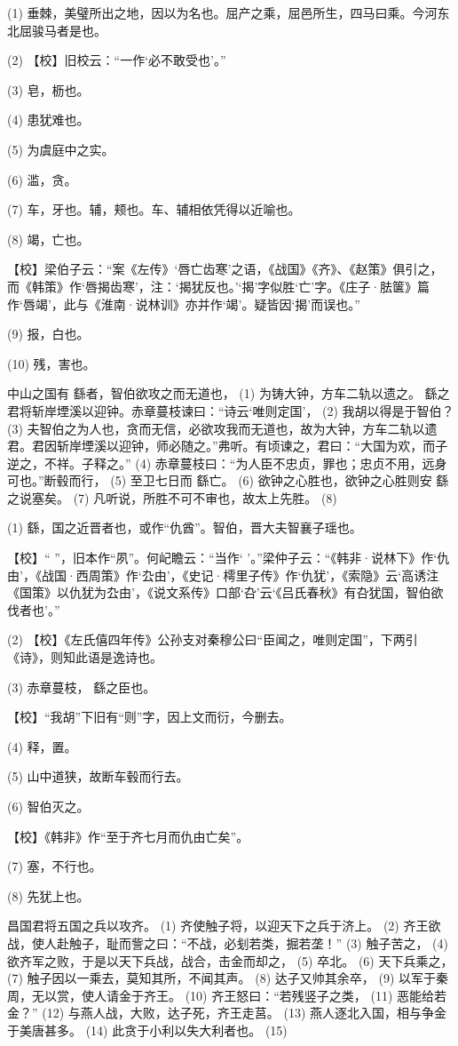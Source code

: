 \documentclass[12pt,UTF8]{ctexbook}
\begin{document}
(1) 垂棘，美璧所出之地，因以为名也。屈产之乘，屈邑所生，四马曰乘。今河东北屈骏马者是也。

(2) 【校】旧校云：“一作‘必不敢受也’。”

(3) 皂，枥也。

(4) 患犹难也。

(5) 为虞庭中之实。

(6) 滥，贪。

(7) 车，牙也。辅，颊也。车、辅相依凭得以近喻也。

(8) 竭，亡也。

【校】梁伯子云：“案《左传》‘唇亡齿寒’之语，《战国》《齐》、《赵策》俱引之，而《韩策》作‘唇揭齿寒’，注：‘揭犹反也。’‘揭’字似胜‘亡’字。《庄子·胠箧》篇作‘唇竭’，此与《淮南·说林训》亦并作‘竭’。疑皆因‘揭’而误也。”

(9) 报，白也。

(10) 残，害也。

中山之国有 繇者，智伯欲攻之而无道也， (1) 为铸大钟，方车二轨以遗之。 繇之君将斩岸堙溪以迎钟。赤章蔓枝谏曰：“诗云‘唯则定国’， (2) 我胡以得是于智伯？ (3) 夫智伯之为人也，贪而无信，必欲攻我而无道也，故为大钟，方车二轨以遗君。君因斩岸堙溪以迎钟，师必随之。”弗听。有顷谏之，君曰：“大国为欢，而子逆之，不祥。子释之。” (4) 赤章蔓枝曰：“为人臣不忠贞，罪也；忠贞不用，远身可也。”断毂而行， (5) 至卫七日而 繇亡。 (6) 欲钟之心胜也，欲钟之心胜则安 繇之说塞矣。 (7) 凡听说，所胜不可不审也，故太上先胜。 (8)

(1) 繇，国之近晋者也，或作“仇酋”。智伯，晋大夫智襄子瑶也。

【校】“ ”，旧本作“夙”。何屺瞻云：“当作‘ ’。”梁仲子云：“《韩非·说林下》作‘仇由’，《战国·西周策》作‘厹由’，《史记·樗里子传》作‘仇犹’，《索隐》云‘高诱注《国策》以仇犹为厹由’，《说文系传》口部‘叴’云‘《吕氏春秋》有叴犹国，智伯欲伐者也’。”

(2) 【校】《左氏僖四年传》公孙支对秦穆公曰“臣闻之，唯则定国”，下两引《诗》，则知此语是逸诗也。

(3) 赤章蔓枝， 繇之臣也。

【校】“我胡”下旧有“则”字，因上文而衍，今删去。

(4) 释，置。

(5) 山中道狭，故断车毂而行去。

(6) 智伯灭之。

【校】《韩非》作“至于齐七月而仇由亡矣”。

(7) 塞，不行也。

(8) 先犹上也。

昌国君将五国之兵以攻齐。 (1) 齐使触子将，以迎天下之兵于济上。 (2) 齐王欲战，使人赴触子，耻而訾之曰：“不战，必刬若类，掘若垄！” (3) 触子苦之， (4) 欲齐军之败，于是以天下兵战，战合，击金而却之， (5) 卒北。 (6) 天下兵乘之， (7) 触子因以一乘去，莫知其所，不闻其声。 (8) 达子又帅其余卒， (9) 以军于秦周，无以赏，使人请金于齐王。 (10) 齐王怒曰：“若残竖子之类， (11) 恶能给若金？” (12) 与燕人战，大败，达子死，齐王走莒。 (13) 燕人逐北入国，相与争金于美唐甚多。 (14) 此贪于小利以失大利者也。 (15)
\end{document}
